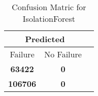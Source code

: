 \begin{table}[] 
\caption{Confusion Matric for IsolationForest} 
\label{Table: Prediction Accuracy-DMDIsolationForest100.0EKF-ignoresolarPanelDipole-solarPanelDipole} 
\centering 
\begin{tabular} 
 {@{}ccc@{}} 
\toprule 
\multicolumn{2}{c}{\textbf{Predicted}}
 \\ \midrule 
\multicolumn{1}{|c|}{Failure} & 
\multicolumn{1}{c|}{No Failure}
 \\ \midrule 
\multicolumn{1}{|c|}{\color{red}\textbf{63422}} & 
\multicolumn{1}{c|}{\color{green}\textbf{0}}
 \\ \midrule 
\multicolumn{1}{|c|}{\color{green}\textbf{106706}} & 
\multicolumn{1}{c|}{\color{green}\textbf{0}}
 \\ \bottomrule 
\end{tabular} 
\end{table} 
